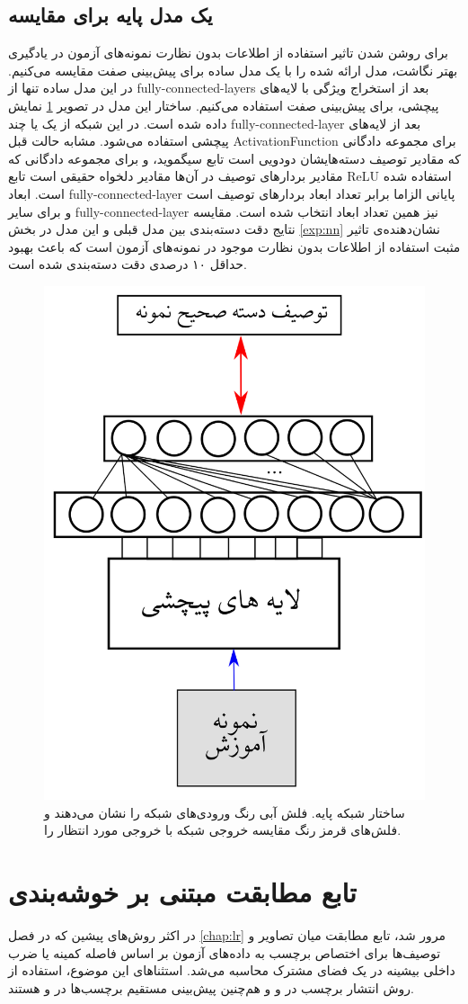 \subsection{یک مدل پایه برای مقایسه}\label{nn_basic}
برای روشن شدن تاثیر استفاده از اطلاعات بدون نظارت نمونه‌های آزمون در یادگیری بهتر نگاشت، مدل ارائه شده را با یک مدل ساده برای پیش‌بینی صفت مقایسه می‌کنیم. در این مدل ساده تنها  از
\glspl{fully-connected-layer}
بعد از استخراج ویژگی با لایه‌های پیچشی، برای پیش‌بینی صفت استفاده می‌کنیم. ساختار این مدل در تصویر \ref{fig:nn_basic} نمایش داده شده است. در این شبکه از یک یا چند
\gls{fully-connected-layer}
بعد از لایه‌های پیچشی استفاده می‌شود. مشابه حالت قبل \gls{ActivationFunction} برای مجموعه دادگانی که مقادیر توصیف دسته‌هایشان دودویی است تابع سیگموید، و برای مجموعه دادگانی که مقادیر بردارهای توصیف در آن‌ها مقادیر دلخواه حقیقی است تابع \gls{ReLU} استفاده شده است.
ابعاد  \gls{fully-connected-layer} پایانی الزاما برابر تعداد ابعاد بردارهای توصیف است و برای سایر   \gls{fully-connected-layer} نیز همین تعداد ابعاد انتخاب شده است.
مقایسه نتایج دقت دسته‌بندی بین مدل قبلی و این مدل در بخش \ref{exp:nn} نشان‌دهنده‌ی تاثیر مثبت استفاده از اطلاعات بدون نظارت موجود در نمونه‌های آزمون است که باعث بهبود حداقل ۱۰ درصدی دقت دسته‌بندی شده است.
\begin{figure}[!ht]
\centering
\includegraphics[width=0.4\linewidth]{images/basic_net}
\caption[شبکه‌ی پایه برای پیش‌بینی صفت]{
ساختار شبکه پایه. فلش آبی رنگ ورودی‌های شبکه را نشان می‌دهند و فلش‌های قرمز رنگ مقایسه خروجی شبکه با خروجی مورد انتظار را.}
\label{fig:nn_basic}
\end{figure}
\section{ تابع مطابقت مبتنی بر خوشه‌بندی }\label{compatibility_function}
در اکثر روش‌های پیشین که در فصل \ref{chap:lr} مرور شد، تابع مطابقت میان تصاویر و توصیف‌ها برای اختصاص برچسب به داده‌های آزمون بر اساس فاصله کمینه یا ضرب داخلی بیشینه در یک فضای مشترک محاسبه می‌شد. استثناهای این موضوع، استفاده از روش انتشار برچسب در \cite{Fu2014} و \cite{Kodirov2015} و هم‌چنین پیش‌بینی مستقیم برچسب‌ها در
\cite{li15max}
و
\cite{semi15}
هستند.

